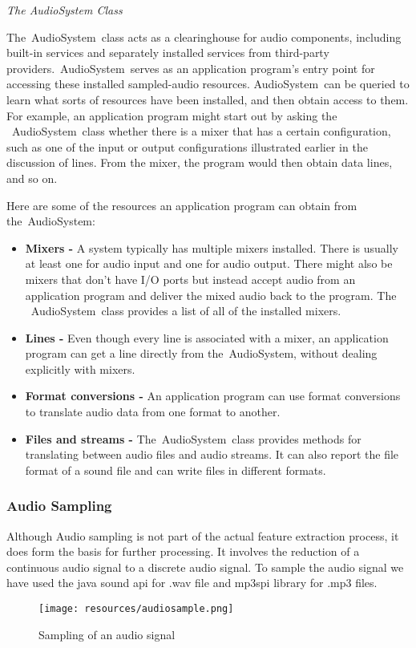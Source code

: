 \textit{The AudioSystem Class}

The AudioSystem class acts as a clearinghouse for audio components, including built-in services and separately installed services from third-party
providers. AudioSystem serves as an application program's entry point for accessing these installed sampled-audio resources. AudioSystem can be queried
to learn what sorts of resources have been installed, and then obtain access to them. For example, an application program might start out by asking the
 AudioSystem class whether there is a mixer that has a certain configuration, such as one of the input or output configurations illustrated earlier in
the discussion of lines. From the mixer, the program would then obtain data lines, and so on.

Here are some of the resources an application program can obtain from the AudioSystem:

\begin{itemize}
        \item \textbf{Mixers -} A system typically has multiple mixers installed. There is usually at least one for audio input and one for audio output. There
                might also be mixers that don't have I/O ports but instead accept audio from an application program and deliver the mixed audio back to the program. The
                 AudioSystem class provides a list of all of the installed mixers.
        \item \textbf{Lines -} Even though every line is associated with a mixer, an application program can get a line directly from the AudioSystem,
                without dealing explicitly with mixers.
        \item \textbf{Format conversions -} An application program can use format conversions to translate audio data from one format to another.
        \item \textbf{Files and streams -} The AudioSystem class provides methods for translating between audio files and audio streams. It can
                also report the file format of a sound file and can write files in different formats.
\end{itemize}


\subsubsection{Audio Sampling}
Although Audio sampling is not part of the actual feature extraction process, it does form the basis for further processing. It involves the
reduction of a continuous audio signal to a discrete audio signal. To sample the audio signal we have used the java sound api for .wav file
and mp3spi library for .mp3 files.
\begin{figure}[h]
        \centering
        \texttt{[image: resources/audiosample.png]}
        \caption{Sampling of an audio signal}
        \label{fig:figure3}
\end{figure}

